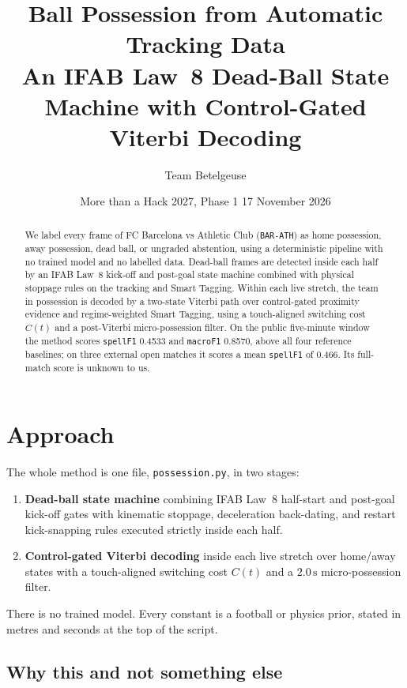 \documentclass[11pt,a4paper]{article}
\title{\bfseries Ball Possession from Automatic Tracking Data\\[4pt]
       \large An IFAB Law~8 Dead-Ball State Machine with Control-Gated Viterbi Decoding}
\author{Team Betelgeuse}
\date{More than a Hack 2027, Phase 1 \textbullet{} 17 November 2026}
\newcommand{\code}[1]{\texttt{#1}}
\begin{document}
\maketitle
\thispagestyle{fancy}

\begin{abstract}
\noindent
We label every frame of FC Barcelona vs Athletic Club (\code{BAR-ATH}) as home possession,
away possession, dead ball, or ungraded abstention, using a deterministic pipeline with no
trained model and no labelled data. Dead-ball frames are detected inside each half by an IFAB
Law~8 kick-off and post-goal state machine combined with physical stoppage rules on the tracking
and Smart Tagging. Within each live stretch, the team in possession is decoded by a two-state
Viterbi path over control-gated proximity evidence and regime-weighted Smart Tagging, using a
touch-aligned switching cost $C(t)$ and a post-Viterbi micro-possession filter. On the public
five-minute window the method scores \code{spellF1} 0.4533 and \code{macroF1} 0.8570, above all
four reference baselines; on three external open matches it scores a mean \code{spellF1} of 0.466.
Its full-match score is unknown to us.
\end{abstract}

\section{Approach}

The whole method is one file, \code{possession.py}, in two stages:

\begin{enumerate}
  \item \textbf{Dead-ball state machine} combining IFAB Law~8 half-start and post-goal kick-off
        gates with kinematic stoppage, deceleration back-dating, and restart kick-snapping rules
        executed strictly inside each half.
  \item \textbf{Control-gated Viterbi decoding} inside each live stretch over home/away states
        with a touch-aligned switching cost $C(t)$ and a $2.0\,\text{s}$ micro-possession filter.
\end{enumerate}

There is no trained model. Every constant is a football or physics prior, stated in metres and
seconds at the top of the script.

\subsection{Why this and not something else}
\end{document}
